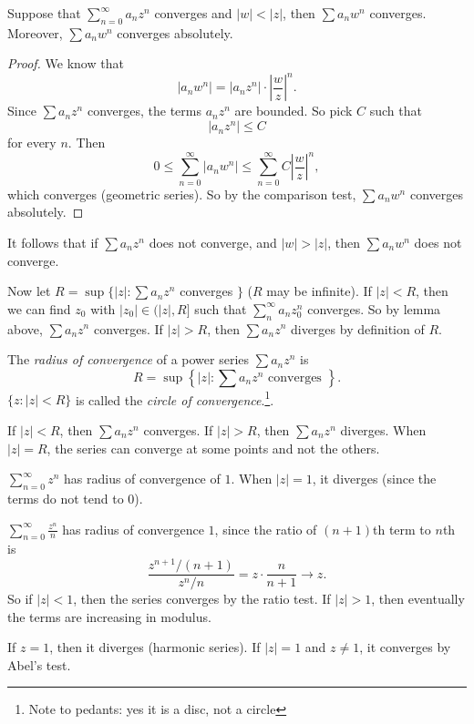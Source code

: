 \documentclass[a4paper]{article}
\begin{document}
\begin{lemma}
  Suppose that $\sum_{n = 0}^\infty a_nz^n$ converges and $|w| < |z|$, then $\sum a_n w^n$ converges. Moreover, $\sum a_nw^n$ converges absolutely.
\end{lemma}

\begin{proof}
  We know that
  \[
    |a_n w^n| = |a_nz^n|\cdot \left|\frac{w}{z}\right|^n.
  \]
  Since $\sum a_nz^n$ converges, the terms $a_nz^n$ are bounded. So pick $C$ such that
  \[
    |a_nz^n| \leq C
  \]
  for every $n$. Then
  \[
    0 \leq \sum_{n = 0}^\infty |a_nw^n| \leq \sum_{n = 0}^\infty C\left|\frac{w}{z}\right|^n,
  \]
  which converges (geometric series). So by the comparison test, $\sum a_nw^n$ converges absolutely.
\end{proof}
\note It follows that if $\sum a_nz^n$ does not converge, and $|w| > |z|$, then $\sum a_nw^n$ does not converge.

Now let $R = \sup\{|z|: \sum a_nz^n$ converges $\}$ ($R$ may be infinite). If $|z| < R$, then we can find $z_0$ with $|z_0|\in (|z|, R]$ such that $\sum_n^\infty a_nz_0^n$ converges. So by lemma above, $\sum a_n z^n$ converges. If $|z| > R$, then $\sum a_nz^n$ diverges by definition of $R$.

\begin{defi}
  The \emph{radius of convergence} of a power series $\sum a_nz^n$ is
  \[
    R = \sup\left\{|z|: \sum a_nz^n\text{ converges }\right\}.
  \]
  $\{z: |z| < R\}$ is called the \emph{circle of convergence}.\footnote{Note to pedants: yes it is a disc, not a circle}.

  If $|z| < R$, then $\sum a_nz^n$ converges. If $|z| > R$, then $\sum a_nz^n$ diverges. When $|z| = R$, the series can converge at some points and not the others.
\end{defi}

\begin{eg}
  $\displaystyle\sum_{n = 0}^\infty z^n$ has radius of convergence of $1$. When $|z| = 1$, it diverges (since the terms do not tend to $0$).
\end{eg}

\begin{eg}
  $\displaystyle\sum_{n = 0}^\infty \frac{z^n}{n}$ has radius of convergence $1$, since the ratio of $(n + 1)$th term to $n$th is
  \[
    \frac{z^{n + 1}/(n + 1)}{z^n /n} = z\cdot\frac{n}{n + 1} \to z.
  \]
  So if $|z| < 1$, then the series converges by the ratio test. If $|z| > 1$, then eventually the terms are increasing in modulus.

  If $z = 1$, then it diverges (harmonic series). If $|z| = 1$ and $z \not= 1$, it converges by Abel's test.
\end{eg}
\end{document}
